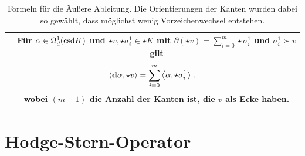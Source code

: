 \begin{table}[htbp]
\begin{tabular}{|c|c|}
\begin{minipage}[c]{0.30\textwidth}
        \centering
      \end{minipage} &
      \begin{minipage}[c]{0.68\textwidth}
        Für \( \alpha\in\Omega_{d}^{1}(\text{csd} K) \) und \( \star v, \star\sigma_{i}^{1} \in \star K \) mit
        \( \partial(\star v) = \sum_{i=0}^{m} \star\sigma_{i}^{1} \) und \( \sigma_{i}^{1} \succ v  \) gilt
        {\begin{align}
          \left\langle \mathbf{d} \alpha , \star v \right\rangle &=  \sum_{i=0}^{m} \left\langle \alpha, \star\sigma_{i}^{1}\right\rangle
          \,\text{,}
        \end{align}}
        wobei \( (m+1) \) die Anzahl der Kanten ist, die \( v \) als Ecke haben.
      \end{minipage} \\\hline
    \end{tabular}
    \caption[Formeln für Äußere Ableitung]{Formeln für die Äußere Ableitung. 
                  Die Orientierungen der Kanten wurden dabei so gewählt, dass möglichst wenig Vorzeichenwechsel entstehen.}
    \label{tabFormelAbleitung}
    \end{table}

  

  

\section{Hodge-Stern-Operator}
\label{secHodgeStar}

